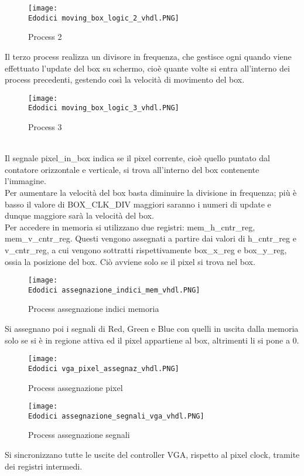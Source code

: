 \documentclass[12pt]{article}
\def \Edodici {Allegati/Esercizio12/}
\begin{document}
{\begin{figure}[ht!]
    \texttt{[image: \\Edodici moving\_box\_logic\_2\_vhdl.PNG]}
    \caption{Process 2}
\end{figure}
\clearpage
Il terzo process realizza un divisore in frequenza, che gestisce ogni quando viene effettuato l’update del box su schermo, cioè quante volte si entra all’interno dei process precedenti, gestendo così la velocità di movimento del box.
\begin{figure}[ht]
    \texttt{[image: \\Edodici moving\_box\_logic\_3\_vhdl.PNG]}
    \caption{Process 3}
\end{figure}
\\Il segnale pixel\_in\_box indica se il pixel corrente, cioè quello puntato dal contatore orizzontale e verticale, si trova all’interno del box contenente l’immagine.
\\Per aumentare la velocità del box basta diminuire la divisione in frequenza; più è basso il valore di BOX\_CLK\_DIV maggiori saranno i numeri di update e dunque maggiore sarà la velocità del box.
\\Per accedere in memoria si utilizzano due registri: mem\_h\_cntr\_reg, mem\_v\_cntr\_reg. Questi vengono assegnati a partire dai valori di h\_cntr\_reg e v\_cntr\_reg, a cui vengono sottratti rispettivamente box\_x\_reg e box\_y\_reg, ossia la posizione del box.  Ciò avviene solo se il pixel si trova nel box.
\clearpage
\begin{figure}[ht]
    \texttt{[image: \\Edodici assegnazione\_indici\_mem\_vhdl.PNG]}
    \caption{Process assegnazione indici memoria}
\end{figure}
Si assegnano poi i segnali di Red, Green e Blue con quelli in uscita dalla memoria solo se si è in regione attiva ed il pixel appartiene al box, altrimenti li si pone a 0.
\begin{figure}[ht!]
    \texttt{[image: \\Edodici vga\_pixel\_assegnaz\_vhdl.PNG]}
    \caption{Process assegnazione pixel}
\end{figure}
\begin{figure}[ht!]
    \texttt{[image: \\Edodici assegnazione\_segnali\_vga\_vhdl.PNG]}
    \caption{Process assegnazione segnali}
\end{figure}
\newpage
Si sincronizzano tutte le uscite del controller VGA, rispetto al pixel clock, tramite dei registri intermedi.
\clearpage
}
\end{document}
